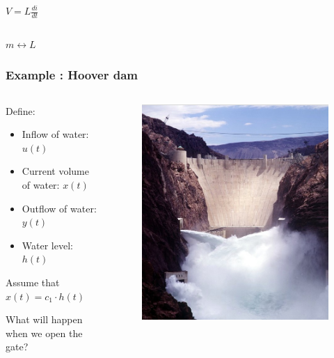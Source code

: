 \begin{frame}
\begin{columns}
		\begin{column}{0.25\linewidth}
			\hspace{3pt}
			$V = L\frac{di}{dt}$
		\end{column}
		
	\end{columns}
	
	\begin{center}
		$\boxed{m \leftrightarrow L} $	
	\end{center}
\end{frame}

\begin{frame}
	\frametitle{Example : Hoover dam}
	\begin{columns}
		\begin{column}{0.6\linewidth}
			Define:
			\begin{itemize}
				\item Inflow of water: $u(t)$
				\item Current volume of water: $x(t)$
				\item Outflow of water: $y(t)$
				\item Water level: $h(t)$
			\end{itemize}
			Assume that $x(t) = c_1\cdot h(t)$
			
			\vspace{6pt}
			What will happen when we open the gate?
		\end{column}
		\begin{column}{0.4\linewidth}
			\begin{figure}
				\centering
				\includegraphics[width=1\linewidth]{img/Hoover-dam}
				\label{fig:Hoover-dam}
			\end{figure}
		\end{column}
	\end{columns}
	

\end{frame}
